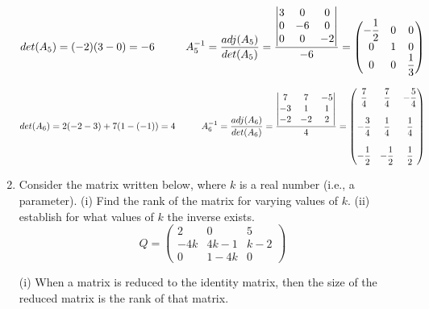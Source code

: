 \documentclass[fleqn]{article}
\begin{document}
\begin{enumerate}
      \textcolor{hwColor}{
        $
        det(A_5)=(-2)(3-0)=-6
        \hskip 1truecm
        A_5^{-1}=\dfrac{adj(A_5)}{det(A_5)}=\dfrac{
          \begin{vmatrix}
           3 & 0 & 0 \\
           0 & -6 & 0 \\
           0 & 0 & -2 \\
          \end{vmatrix}
        }{-6}=\begin{pmatrix}
          -\dfrac{1}{2}& 0 & 0 \\
          0 & 1 & 0 \\
          0 & 0 & \dfrac{1}{3}\\
        \end{pmatrix}
        $
      }

      \textcolor{hwColor}{
        $
        det(A_6)=2(-2-3)+7(1-(-1))=4
        \hskip 1truecm
        A_6^{-1}=\dfrac{adj(A_6)}{det(A_6)}=\dfrac{
          \begin{vmatrix}
           7 & 7 & -5 \\
           -3 & 1 & 1 \\
           -2 & -2 & 2 \\
          \end{vmatrix}
        }{4}=\begin{pmatrix}
         \dfrac{7}{4} & \dfrac{7}{4} & -\dfrac{5}{4} \\
         \\
         -\dfrac{3}{4} & \dfrac{1}{4} & \dfrac{1}{4} \\
         \\
         -\dfrac{1}{2} & -\dfrac{1}{2} & \dfrac{1}{2} \\
        \end{pmatrix}
        $
      }

    
    \item  Consider the matrix written below, where $k$ is a real number (i.e., a parameter). (i) Find the rank of the matrix for varying values of $k$. (ii) establish for what values of $k$ the inverse exists. 
      $$
      Q = 
      \begin{pmatrix}
      2 & 0 & 5 \\
      -4k & 4k-1 & k-2 \\
      0 & 1-4k & 0
      \end{pmatrix}
      $$

      \textcolor{hwColor}{
        (i) When a matrix is reduced to the identity matrix, then the size of the reduced matrix is the rank of that matrix.
      }


\end{enumerate}
\end{document}

